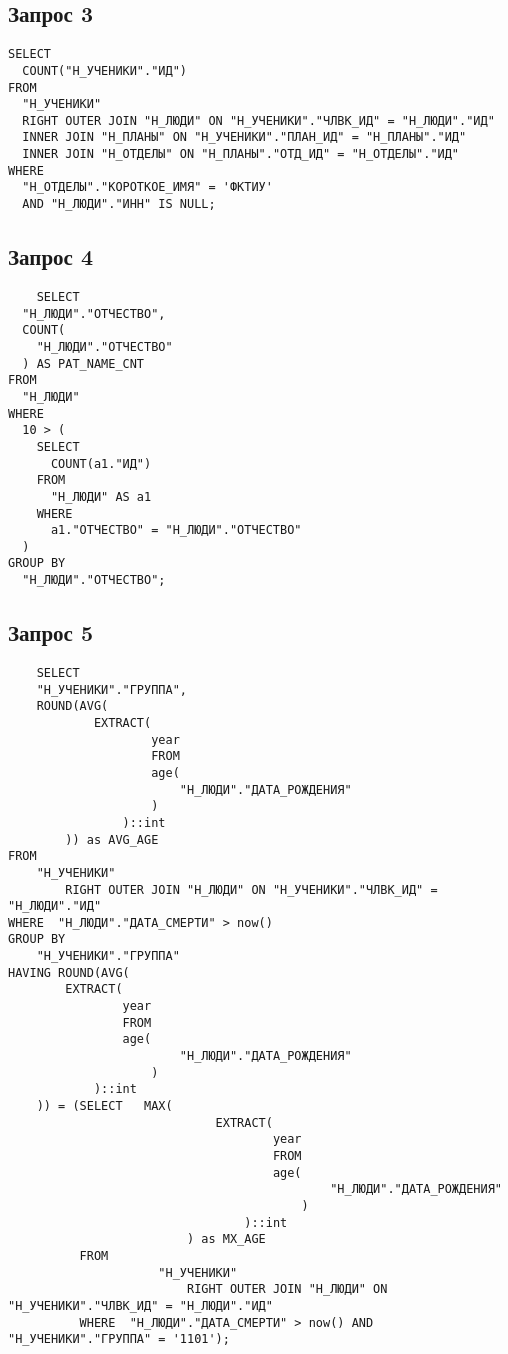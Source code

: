 \documentclass{article}
\begin{document}
\subsection{Запрос 3} 
\begin{verbatim}
SELECT 
  COUNT("Н_УЧЕНИКИ"."ИД") 
FROM 
  "Н_УЧЕНИКИ" 
  RIGHT OUTER JOIN "Н_ЛЮДИ" ON "Н_УЧЕНИКИ"."ЧЛВК_ИД" = "Н_ЛЮДИ"."ИД" 
  INNER JOIN "Н_ПЛАНЫ" ON "Н_УЧЕНИКИ"."ПЛАН_ИД" = "Н_ПЛАНЫ"."ИД" 
  INNER JOIN "Н_ОТДЕЛЫ" ON "Н_ПЛАНЫ"."ОТД_ИД" = "Н_ОТДЕЛЫ"."ИД" 
WHERE 
  "Н_ОТДЕЛЫ"."КОРОТКОЕ_ИМЯ" = 'ФКТИУ' 
  AND "Н_ЛЮДИ"."ИНН" IS NULL;
\end{verbatim}

\subsection{Запрос 4} 
\begin{verbatim}
    SELECT 
  "Н_ЛЮДИ"."ОТЧЕСТВО", 
  COUNT(
    "Н_ЛЮДИ"."ОТЧЕСТВО"
  ) AS PAT_NAME_CNT 
FROM 
  "Н_ЛЮДИ" 
WHERE 
  10 > (
    SELECT 
      COUNT(a1."ИД") 
    FROM 
      "Н_ЛЮДИ" AS a1 
    WHERE 
      a1."ОТЧЕСТВО" = "Н_ЛЮДИ"."ОТЧЕСТВО"
  ) 
GROUP BY 
  "Н_ЛЮДИ"."ОТЧЕСТВО";
\end{verbatim}

\subsection{Запрос 5}
\begin{verbatim}
    SELECT
    "Н_УЧЕНИКИ"."ГРУППА",
    ROUND(AVG(
            EXTRACT(
                    year
                    FROM
                    age(
                        "Н_ЛЮДИ"."ДАТА_РОЖДЕНИЯ"
                    )
                )::int
        )) as AVG_AGE
FROM
    "Н_УЧЕНИКИ"
        RIGHT OUTER JOIN "Н_ЛЮДИ" ON "Н_УЧЕНИКИ"."ЧЛВК_ИД" = "Н_ЛЮДИ"."ИД"
WHERE  "Н_ЛЮДИ"."ДАТА_СМЕРТИ" > now()
GROUP BY
    "Н_УЧЕНИКИ"."ГРУППА"
HAVING ROUND(AVG(
        EXTRACT(
                year
                FROM
                age(
                        "Н_ЛЮДИ"."ДАТА_РОЖДЕНИЯ"
                    )
            )::int
    )) = (SELECT   MAX(
                             EXTRACT(
                                     year
                                     FROM
                                     age(
                                             "Н_ЛЮДИ"."ДАТА_РОЖДЕНИЯ"
                                         )
                                 )::int
                         ) as MX_AGE
          FROM
                     "Н_УЧЕНИКИ"
                         RIGHT OUTER JOIN "Н_ЛЮДИ" ON "Н_УЧЕНИКИ"."ЧЛВК_ИД" = "Н_ЛЮДИ"."ИД"
          WHERE  "Н_ЛЮДИ"."ДАТА_СМЕРТИ" > now() AND "Н_УЧЕНИКИ"."ГРУППА" = '1101');
\end{verbatim}
\end{document}
